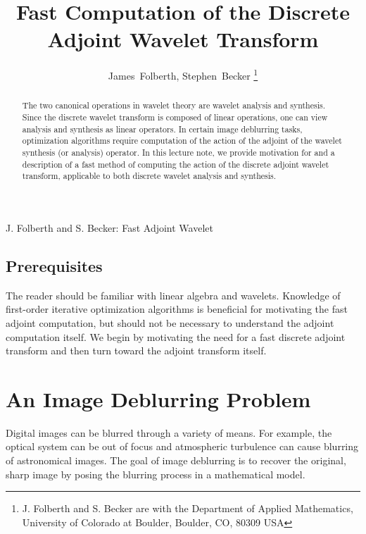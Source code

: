 \documentclass[journal]{IEEEtran}
\begin{document}
\title{Fast Computation of the Discrete Adjoint Wavelet Transform}
\author{James~Folberth,
        Stephen~Becker%
\thanks{J. Folberth and S. Becker are with the Department
of Applied Mathematics, University of Colorado at Boulder,
Boulder, CO, 80309 USA}}

%
{J. Folberth and S. Becker: Fast Adjoint Wavelet}

\maketitle

\begin{abstract}
   The two canonical operations in wavelet theory are wavelet analysis and synthesis.  Since the discrete wavelet transform is composed of linear operations, one can view analysis and synthesis as linear operators.  In certain image deblurring tasks, optimization algorithms require computation of the action of the adjoint of the wavelet synthesis (or analysis) operator.  In this lecture note, we provide motivation for and a description of a fast method of computing the action of the discrete adjoint wavelet transform, applicable to both discrete wavelet analysis and synthesis.
\end{abstract}

\subsection{Prerequisites}
The reader should be familiar with linear algebra and wavelets.  Knowledge of first-order iterative optimization algorithms is beneficial for motivating the fast adjoint computation, but should not be necessary to understand the adjoint computation itself.  We begin by motivating the need for a fast discrete adjoint transform and then turn toward the adjoint transform itself.\\


\section{An Image Deblurring Problem}
Digital images can be blurred through a variety of means.  For example, the optical system can be out of focus and atmospheric turbulence can cause blurring of astronomical images.  The goal of image deblurring is to recover the original, sharp image by posing the blurring process in a mathematical model.\\
\end{document}

